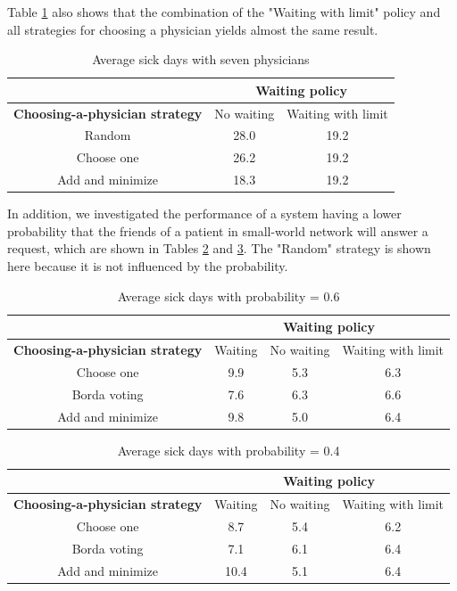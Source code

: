 Table \ref{ch3:t7physician} also shows that the combination of the "Waiting with limit" policy and all strategies for choosing a physician yields almost the same result.

\begin{table}[!t]
\centering
\caption{Average sick days with seven physicians}

\begin{tabular}{|c|c|c|}
\hline
& \multicolumn{2}{c|}{\textbf{Waiting policy}}\\ \hline
\textbf{Choosing-a-physician strategy}
& No waiting & Waiting with limit\\ \hline
Random& 28.0 & 19.2 \\ \hline
Choose one& 26.2 & 19.2 \\ \hline
Add and minimize & 18.3 & 19.2 \\ \hline
\end{tabular}
\label{ch3:t7physician}
\end{table}

In addition, we investigated the performance of a system having a lower probability that the friends of a patient in small-world network will answer a request, which are shown in Tables \ref{ch3:tdaysp0.6} and \ref{ch3:tdaysp0.4}. The "Random" strategy is shown here because it is not influenced by the probability.

\begin{table}[!t]
\centering
\caption{Average sick days with probability = 0.6}

\begin{tabular}{|c|c|c|c|}
\hline
& \multicolumn{3}{c|}{\textbf{Waiting policy}}\\ \hline
\textbf{Choosing-a-physician strategy}
& Waiting & No waiting & Waiting with limit\\ \hline
Choose one& 9.9 & 5.3 & 6.3\\ \hline
Borda voting& 7.6 & 6.3 & 6.6\\ \hline
Add and minimize & 9.8 & 5.0 & 6.4\\ \hline
\end{tabular}
\label{ch3:tdaysp0.6}
\end{table}

\begin{table}[!t]
\centering
\caption{Average sick days with probability = 0.4}

\begin{tabular}{|c|c|c|c|}
\hline
& \multicolumn{3}{c|}{\textbf{Waiting policy}}\\ \hline
\textbf{Choosing-a-physician strategy}
& Waiting & No waiting & Waiting with limit\\ \hline
Choose one&8.7 &5.4& 6.2\\ \hline
Borda voting&7.1& 6.1& 6.4\\ \hline
Add and minimize &10.4& 5.1 &6.4\\ \hline
\end{tabular}
\label{ch3:tdaysp0.4}
\end{table}

